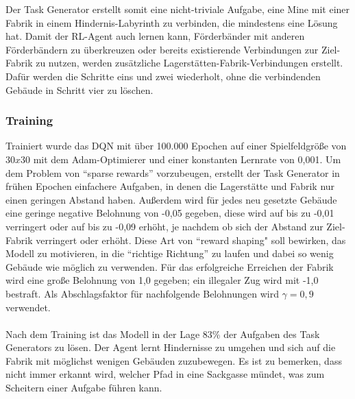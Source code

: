 Der Task Generator erstellt somit eine nicht-triviale Aufgabe, eine Mine mit einer Fabrik in einem Hindernis-Labyrinth zu verbinden, die mindestens eine Lösung hat.
Damit der RL-Agent auch lernen kann, Förderbänder mit anderen Förderbändern zu überkreuzen oder bereits existierende Verbindungen zur Ziel-Fabrik zu nutzen, werden zusätzliche Lagerstätten-Fabrik-Verbindungen erstellt. Dafür werden die Schritte eins und zwei wiederholt, ohne die verbindenden Gebäude in Schritt vier zu löschen.

\subsubsection{Training}
Trainiert wurde das DQN  mit über 100.000 Epochen auf einer Spielfeldgröße von $30x30$ mit dem Adam-Optimierer und einer konstanten Lernrate von 0,001. Um dem Problem von “sparse rewards” vorzubeugen, erstellt der Task Generator in frühen Epochen einfachere Aufgaben, in denen die Lagerstätte und Fabrik nur einen geringen Abstand haben. Außerdem wird für jedes neu gesetzte Gebäude eine geringe negative Belohnung von -0,05 gegeben, diese wird auf bis zu -0,01 verringert oder auf bis zu -0,09 erhöht, je nachdem ob sich der Abstand zur Ziel-Fabrik verringert oder erhöht. Diese Art von “reward shaping" soll bewirken, das Modell zu motivieren, in die “richtige Richtung” zu laufen und dabei so wenig Gebäude wie möglich zu verwenden. Für das erfolgreiche Erreichen der Fabrik wird eine große Belohnung von 1,0 gegeben; ein illegaler Zug wird mit -1,0 bestraft. Als Abschlagsfaktor für nachfolgende Belohnungen wird $\gamma=0,9$ verwendet.
\\\\
Nach dem Training ist das Modell in der Lage 83\% der Aufgaben des Task Generators zu lösen. Der Agent lernt Hindernisse zu umgehen und sich auf die Fabrik mit möglichst wenigen Gebäuden zuzubewegen. Es ist zu bemerken, dass nicht immer erkannt wird, welcher Pfad in eine Sackgasse mündet, was zum Scheitern einer Aufgabe führen kann.

